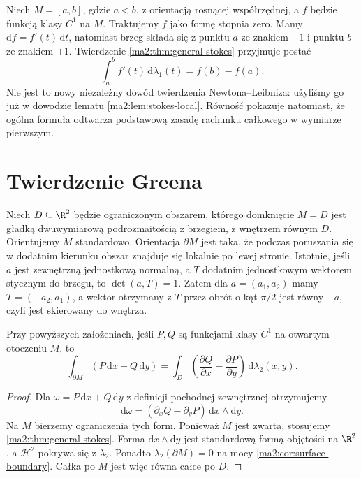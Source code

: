 \begin{przyklad}
\label{ma2:ex:stokes-fundamental}
Niech $M=[a,b]$, gdzie $a<b$, z orientacją
rosnącej współrzędnej, a $f$ będzie funkcją
klasy $C^1$ na $M$. Traktujemy $f$ jako formę
stopnia zero. Mamy $\mathrm df=f'(t)\,\mathrm dt$,
natomiast brzeg składa się z punktu $a$
ze znakiem $-1$ i punktu $b$ ze znakiem $+1$.
Twierdzenie \ref{ma2:thm:general-stokes}
przyjmuje postać
\[
 \int_a^b f'(t)\,\mathrm d\lambda_1(t)=f(b)-f(a).
\]
Nie jest to nowy niezależny dowód twierdzenia
Newtona--Leibniza: użyliśmy go już w dowodzie
lematu \ref{ma2:lem:stokes-local}. Równość pokazuje
natomiast, że ogólna formuła odtwarza podstawową
zasadę rachunku całkowego w wymiarze pierwszym.
\end{przyklad}

\section{Twierdzenie Greena}

Niech $D\subseteq\R^2$ będzie ograniczonym obszarem,
którego domknięcie $M=\overline D$ jest gładką
dwuwymiarową podrozmaitością z brzegiem,
z wnętrzem równym $D$. Orientujemy $M$ standardowo.
Orientacja $\partial M$ jest taka, że podczas
poruszania się w dodatnim kierunku obszar
znajduje się lokalnie po lewej stronie.
Istotnie, jeśli $a$ jest zewnętrzną jednostkową
normalną, a $T$ dodatnim jednostkowym wektorem
stycznym do brzegu, to $\det(a,T)=1$.
Zatem dla $a=(a_1,a_2)$ mamy
$T=(-a_2,a_1)$, a wektor otrzymany z $T$
przez obrót o kąt $\pi/2$ jest równy $-a$,
czyli jest skierowany do wnętrza.

\begin{twierdzenie}
\label{ma2:thm:green-circulation}
Przy powyższych założeniach, jeśli $P,Q$ są
funkcjami klasy $C^1$ na otwartym otoczeniu $M$, to
\[
 \int_{\partial M}(P\,\mathrm dx+Q\,\mathrm dy)
 =\int_D\left(\frac{\partial Q}{\partial x}
             -\frac{\partial P}{\partial y}\right)
 \,\mathrm d\lambda_2(x,y).
\]
\end{twierdzenie}
\begin{proof}
Dla $\omega=P\,\mathrm dx+Q\,\mathrm dy$
z definicji pochodnej zewnętrznej otrzymujemy
\[
 \mathrm d\omega=
 (\partial_x Q-\partial_y P)\,\mathrm dx\wedge\mathrm dy.
\]
Na $M$ bierzemy ograniczenia tych form.
Ponieważ $M$ jest zwarta, stosujemy
\ref{ma2:thm:general-stokes}.
Forma $\mathrm dx\wedge\mathrm dy$ jest standardową
formą objętości na $\R^2$, a $\mathcal H^2$
pokrywa się z $\lambda_2$.
Ponadto $\lambda_2(\partial M)=0$
na mocy \ref{ma2:cor:surface-boundary}.
Całka po $M$ jest więc równa całce po $D$.
\end{proof}

